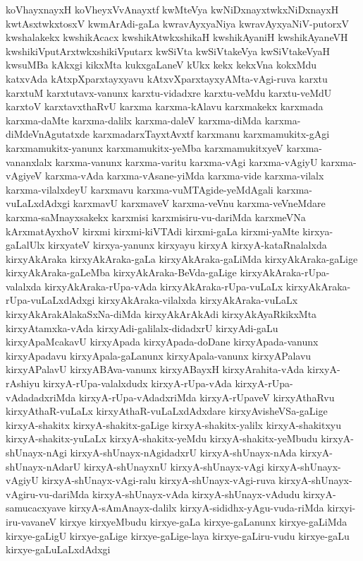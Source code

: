 {koVhayxnayxH
koVheyxVvAnayxtf
kwMteVya
kwNiDxnayxtwkxNiDxnayxH
kwtAsxtwkxtosxV
kwmArAdi-gaLa
kwravAyxyaNiya
kwravAyxyaNiV-putorxV
kwshalakekx
kwshikAcacx
kwshikAtwkxshikaH
kwshikAyaniH
kwshikAyaneVH
kwshikiVputArxtwkxshikiVputarx
kwSiVta
kwSiVtakeVya
kwSiVtakeVyaH
kwsuMBa
kAkxgi
kikxMta
kukxgaLaneV
kUkx
kekx
kekxVna
kokxMdu
katxvAda
kAtxpXparxtayxyavu
kAtxvXparxtayxyAMta-vAgi-ruva
karxtu
karxtuM
karxtutavx-vanunx
karxtu-vidadxre
karxtu-veMdu
karxtu-veMdU
karxtoV
karxtavxthaRvU
karxma
karxma-kAlavu
karxmakekx
karxmada
karxma-daMte
karxma-dalilx
karxma-daleV
karxma-diMda
karxma-diMdeVnAgutatxde
karxmadarxTayxtAvxtf
karxmanu
karxmamukitx-gAgi
karxmamukitx-yanunx
karxmamukitx-yeMba
karxmamukitxyeV
karxma-vananxlalx
karxma-vanunx
karxma-varitu
karxma-vAgi
karxma-vAgiyU
karxma-vAgiyeV
karxma-vAda
karxma-vAsane-yiMda
karxma-vide
karxma-vilalx
karxma-vilalxdeyU
karxmavu
karxma-vuMTAgide-yeMdAgali
karxma-vuLaLxdAdxgi
karxmavU
karxmaveV
karxma-veVnu
karxma-veVneMdare
karxma-saMnayxsakekx
karxmisi
karxmisiru-vu-dariMda
karxmeVNa
kArxmatAyxhoV
kirxmi
kirxmi-kiVTAdi
kirxmi-gaLa
kirxmi-yaMte
kirxya-gaLalUlx
kirxyateV
kirxya-yanunx
kirxyayu
kirxyA
kirxyA-kataRnalalxda
kirxyAkAraka
kirxyAkAraka-gaLa
kirxyAkAraka-gaLiMda
kirxyAkAraka-gaLige
kirxyAkAraka-gaLeMba
kirxyAkAraka-BeVda-gaLige
kirxyAkAraka-rUpa-valalxda
kirxyAkAraka-rUpa-vAda
kirxyAkAraka-rUpa-vuLaLx
kirxyAkAraka-rUpa-vuLaLxdAdxgi
kirxyAkAraka-vilalxda
kirxyAkAraka-vuLaLx
kirxyAkArakAlakaSxNa-diMda
kirxyAkArAkAdi
kirxyAkAyaRkikxMta
kirxyAtamxka-vAda
kirxyAdi-galilalx-didadxrU
kirxyAdi-gaLu
kirxyApaMcakavU
kirxyApada
kirxyApada-doDane
kirxyApada-vanunx
kirxyApadavu
kirxyApala-gaLanunx
kirxyApala-vanunx
kirxyAPalavu
kirxyAPalavU
kirxyABAva-vanunx
kirxyABayxH
kirxyArahita-vAda
kirxyA-rAshiyu
kirxyA-rUpa-valalxdudx
kirxyA-rUpa-vAda
kirxyA-rUpa-vAdadadxriMda
kirxyA-rUpa-vAdadxriMda
kirxyA-rUpaveV
kirxyAthaRvu
kirxyAthaR-vuLaLx
kirxyAthaR-vuLaLxdAdxdare
kirxyAvisheVSa-gaLige
kirxyA-shakitx
kirxyA-shakitx-gaLige
kirxyA-shakitx-yalilx
kirxyA-shakitxyu
kirxyA-shakitx-yuLaLx
kirxyA-shakitx-yeMdu
kirxyA-shakitx-yeMbudu
kirxyA-shUnayx-nAgi
kirxyA-shUnayx-nAgidadxrU
kirxyA-shUnayx-nAda
kirxyA-shUnayx-nAdarU
kirxyA-shUnayxnU
kirxyA-shUnayx-vAgi
kirxyA-shUnayx-vAgiyU
kirxyA-shUnayx-vAgi-ralu
kirxyA-shUnayx-vAgi-ruva
kirxyA-shUnayx-vAgiru-vu-dariMda
kirxyA-shUnayx-vAda
kirxyA-shUnayx-vAdudu
kirxyA-samucacxyave
kirxyA-sAmAnayx-dalilx
kirxyA-sididhx-yAgu-vuda-riMda
kirxyi-iru-vavaneV
kirxye
kirxyeMbudu
kirxye-gaLa
kirxye-gaLanunx
kirxye-gaLiMda
kirxye-gaLigU
kirxye-gaLige
kirxye-gaLige-laya
kirxye-gaLiru-vudu
kirxye-gaLu
kirxye-gaLuLaLxdAdxgi
}
